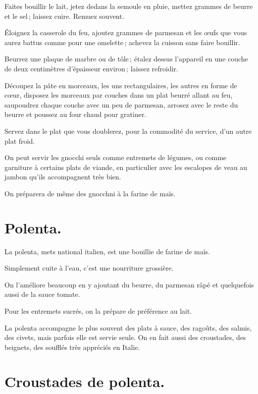 Faites bouillir le lait, jetez dedans la semoule en pluie, mettez {\mmm}
grammes de beurre et le sel ; laissez cuire. Remuez souvent.

Éloignez la casserole du feu, ajoutez {\mmm} grammes de parmesan et les
œufs que vous aurez battus comme pour une omelette ; achevez la cuisson sans
faire bouillir.

Beurrez une plaque de marbre ou de tôle ; étalez dessus l'appareil en une
couche de deux centimètres d'épaisseur environ ; laissez refroidir.

Découpez la pâte en morceaux, les uns rectangulaires, les autres en forme de
cœur, disposez les morceaux par couches dans un plat beurré allant au feu,
saupoudrez chaque couche avec un peu de parmesan, arrosez avec le reste du
beurre et poussez au four chaud pour gratiner.

Servez dans le plat que vous doublerez, pour la commodité du service, d'un
autre plat froid.

On peut servir les gnocchi seuls comme entremets de légumes, ou comme garniture
à certains plats de viande, en particulier avec les escalopes de veau au jambon
qu'ils accompagnent très bien.

\sk

On préparera de même des gnocchni à la farine de maïs.

\section*{\centering Polenta.}
{}

La polenta, mets national italien, est une bouillie de farine de maïs.

Simplement cuite à l'eau, c'est une nourriture grossière.

On l'améliore beaucoup en y ajoutant du beurre, du parmesan râpé et quelquefois
aussi de la sauce tomate.

Pour les entremets sucrés, on la prépare de préférence au lait.

La polenta accompagne le plus souvent des plats à sauce, des ragoûts, des
salmis, des civets, mais parfois elle est servie seule. On en fait aussi des
croustades, des beignets, des soufflés très appréciés en Italie.

\section*{\centering Croustades de polenta.}
{}

